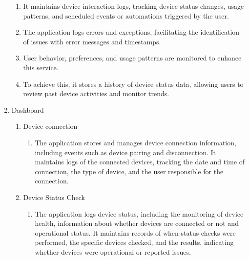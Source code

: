 \begin{enumerate}[label=\arabic*.]
\begin{enumerate}[label*={\arabic*.},ref=\theenumi.\arabic*]
        \item It maintains device interaction logs, tracking device status changes, usage patterns, and scheduled events or automations triggered by the user. \\
        
        \item The application logs errors and exceptions, facilitating the identification of issues with error messages and timestamps. \\
        
        \item User behavior, preferences, and usage patterns are monitored to enhance this service. \\
        
        \item To achieve this, it stores a history of device status data, allowing users to review past device activities and monitor trends.\\
    \end{enumerate}


    \item {\large{Dashboard}}
    \begin{enumerate}[label=\arabic*.]
        \item {\large{Device connection}}\\
        \begin{enumerate}[label*={\arabic*.},ref=\theenumi.\arabic*]
        \setlength{\itemindent}{0.5cm}
            \item The application stores and manages device connection information, including events such as device pairing and disconnection. It maintains logs of the connected devices, tracking the date and time of connection, the type of device, and the user responsible for the connection.\\
        \end{enumerate}
        
        \item {\large{Device Status Check}}\\
        \begin{enumerate}[label*={\arabic*.},ref=\theenumi.\arabic*]
        \setlength{\itemindent}{0.5cm}
            \item The application logs device status, including the monitoring of device health, information about whether devices are connected or not and operational status. It maintains records of when status checks were performed, the specific devices checked, and the results, indicating whether devices were operational or reported issues.\\
        \end{enumerate}
        

\end{enumerate}
\end{enumerate}

